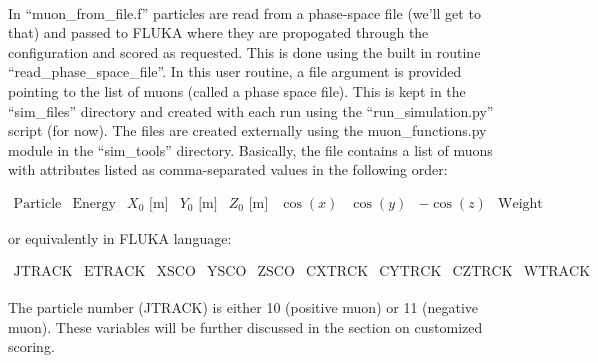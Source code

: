 \paragraph{}
In ``muon\_from\_file.f'' particles are read from a phase-space file (we'll get to that) and passed to FLUKA where they are propogated through the configuration and scored as requested. This is done using the built in routine ``read\_phase\_space\_file''. In this user routine, a file argument is provided pointing to the list of muons (called a phase space file). This is kept in the ``sim\_files'' directory and created with each run using the ``run\_simulation.py'' script (for now). The files are created externally using the muon\_functions.py module in the ``sim\_tools'' directory. Basically, the file contains a list of muons with attributes listed as comma-separated values in the following order:

\[
    \begin{matrix}
        \text{Particle No.} & \text{Energy  [GeV]} & X_0 \text{ [m]} & Y_0 \text{ [m]}& Z_0 \text{ [m]}& \cos(x) & \cos(y) & -\cos(z) & \text{Weight}
    \end{matrix}
\]

or equivalently in FLUKA language:

\[
    \begin{matrix}
        \text{JTRACK} & \text{ETRACK} & \text{XSCO} & \text{YSCO} & \text{ZSCO} & \text{CXTRCK} & \text{CYTRCK} & \text{CZTRCK} & \text{WTRACK}
    \end{matrix}
\]

\paragraph{}
The particle number (JTRACK) is either 10 (positive muon) or 11 (negative muon). These variables will be further discussed in the section on customized scoring. 

